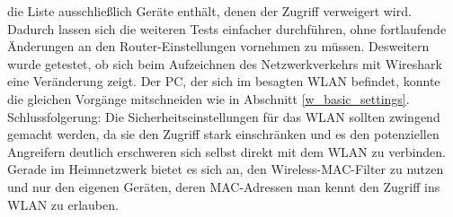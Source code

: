 	die Liste ausschließlich Geräte enthält, denen der Zugriff verweigert wird.
	Dadurch lassen sich die weiteren Tests einfacher durchführen, ohne fortlaufende 
	Änderungen an den Router-Einstellungen vornehmen zu müssen.
	Desweitern wurde getestet, ob sich beim Aufzeichnen des Netzwerkverkehrs mit
	Wireshark eine Veränderung zeigt. Der PC, der sich im besagten WLAN befindet,
	konnte die gleichen Vorgänge mitschneiden wie in Abschnitt \ref{w_basic_settings}.
	\newline
	Schlussfolgerung: Die Sicherheitseinstellungen für das WLAN sollten zwingend gemacht
	werden, da sie den Zugriff stark einschränken und es den potenziellen
	Angreifern deutlich erschweren sich selbst direkt mit dem WLAN zu verbinden.
	Gerade im Heimnetzwerk bietet es sich an, den Wireless-MAC-Filter zu 
	nutzen und nur den eigenen Geräten, deren MAC-Adressen man kennt den Zugriff
	ins WLAN zu erlauben.

